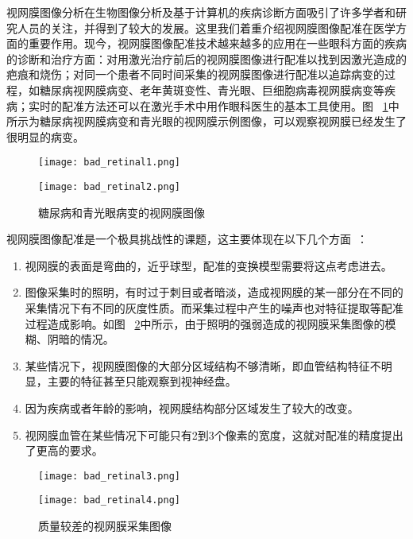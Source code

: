 视网膜图像分析在生物图像分析及基于计算机的疾病诊断方面吸引了许多学者和研究人员的关注，并得到了较大的发展。这里我们着重介绍视网膜图像配准在医学方面的重要作用。现今，视网膜图像配准技术越来越多的应用在一些眼科方面的疾病的诊断和治疗方面：对用激光治疗前后的视网膜图像进行配准以找到因激光造成的疤痕和烧伤；对同一个患者不同时间采集的视网膜图像进行配准以追踪病变的过程，如糖尿病视网膜病变、老年黄斑变性、青光眼、巨细胞病毒视网膜病变等疾病；实时的配准方法还可以在激光手术中用作眼科医生的基本工具使用。图 ~\ref{bad_retinal}中所示为糖尿病视网膜病变和青光眼的视网膜示例图像，可以观察视网膜已经发生了很明显的病变。
  \begin{figure}[ht!]
     \centering
 \begin{minipage}{0.45\linewidth}
  \texttt{[image: bad\_retinal1.png]}
\end{minipage}
\begin{minipage}{0.45\linewidth}
  \texttt{[image: bad\_retinal2.png]}
\end{minipage}
  \caption{糖尿病和青光眼病变的视网膜图像}
    \label{bad_retinal}
 \end{figure}
 
视网膜图像配准是一个极具挑战性的课题，这主要体现在以下几个方面~\cite{can2002}：
 \begin{enumerate}
\item 视网膜的表面是弯曲的，近乎球型，配准的变换模型需要将这点考虑进去。
\item 图像采集时的照明，有时过于刺目或者暗淡，造成视网膜的某一部分在不同的采集情况下有不同的灰度性质。而采集过程中产生的噪声也对特征提取等配准过程造成影响。如图 ~\ref{bad_retinal2}中所示，由于照明的强弱造成的视网膜采集图像的模糊、阴暗的情况。
\item 某些情况下，视网膜图像的大部分区域结构不够清晰，即血管结构特征不明显，主要的特征甚至只能观察到视神经盘。
\item 因为疾病或者年龄的影响，视网膜结构部分区域发生了较大的改变。
\item 视网膜血管在某些情况下可能只有2到3个像素的宽度，这就对配准的精度提出了更高的要求。
 \end{enumerate}
   \begin{figure}[ht!]
   \centering
 \begin{minipage}{0.45\linewidth}
  \centering
  \texttt{[image: bad\_retinal3.png]}
\end{minipage}
\begin{minipage}{0.45\linewidth}
  \centering
  \texttt{[image: bad\_retinal4.png]}
\end{minipage}
  \caption{质量较差的视网膜采集图像}
    \label{bad_retinal2}
 \end{figure}
 
